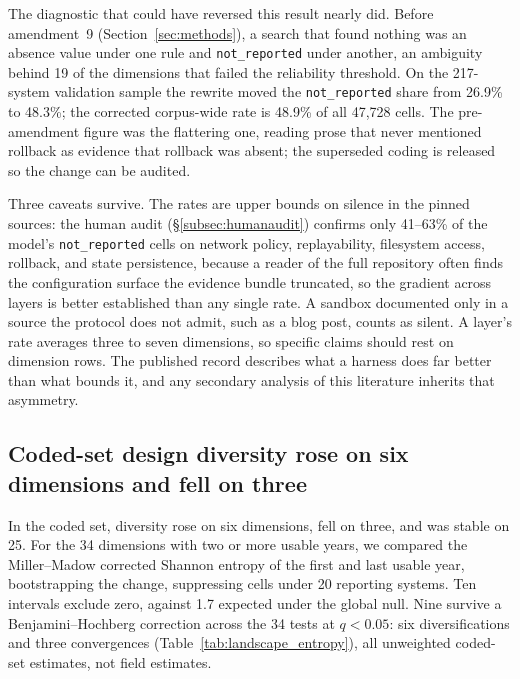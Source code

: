 The diagnostic that could have reversed this result nearly did. Before amendment~9
(Section~\ref{sec:methods}), a search that found nothing was an absence value under one rule and
\texttt{not\_reported} under another, an ambiguity behind 19 of the dimensions that failed the
reliability threshold. On the 217-system validation sample the rewrite moved the \texttt{not\_reported}
share from 26.9\% to 48.3\%; the corrected corpus-wide rate is 48.9\% of all 47,728 cells. The
pre-amendment figure was the flattering one, reading prose that never mentioned rollback as evidence that
rollback was absent; the superseded coding is released so the change can be audited.

Three caveats survive. The rates are upper bounds on silence in the pinned sources: the human audit
(\S\ref{subsec:humanaudit}) confirms only 41--63\% of the model's \texttt{not\_reported} cells on network
policy, replayability, filesystem access, rollback, and state persistence, because a reader of the full
repository often finds the configuration surface the evidence bundle truncated, so the gradient across
layers is better established than any single rate. A sandbox documented only in a source the protocol
does not admit, such as a blog post, counts as silent. A layer's rate averages three to seven dimensions, so specific claims should rest
on dimension rows. The published record describes what a harness does far better than what bounds it,
and any secondary analysis of this literature inherits that asymmetry.

\subsection{Coded-set design diversity rose on six dimensions and fell on three}
\label{subsec:convergence}

In the coded set, diversity rose on six dimensions, fell on three, and was stable on 25. For the 34 dimensions with two or more usable
years, we compared the Miller--Madow corrected Shannon entropy \citep{paninski2003entropy} of the first
and last usable year, bootstrapping the change, suppressing cells under 20 reporting systems. Ten
intervals exclude zero, against 1.7 expected under the global null. Nine survive a Benjamini--Hochberg
correction across the 34 tests at $q < 0.05$: six diversifications and three convergences
(Table~\ref{tab:landscape_entropy}), all unweighted coded-set estimates, not field estimates.

